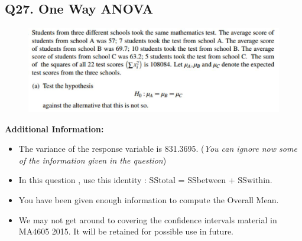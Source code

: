 \documentclass[a4paper,12pt]{article}
\begin{document}
\subsection*{Q27. One Way ANOVA }
\begin{figure}[h!]
	\centering
	\includegraphics[width=0.7\linewidth]{image/Q27review1}
	
\end{figure}
\noindent \textbf{Additional Information: }
\begin{itemize}
	\item The variance of the response variable is 831.3695. (\textit{You can ignore now some of the information given in the question}) 
	\item  In this question , use this identity : SStotal = SSbetween + SSwithin.
	\item  You have been given enough information to compute the Overall Mean.
	\item  We may not get around to covering the confidence intervals material in MA4605 2015. It will be retained for possible use in future.
\end{itemize}
\newpage
\end{document}
